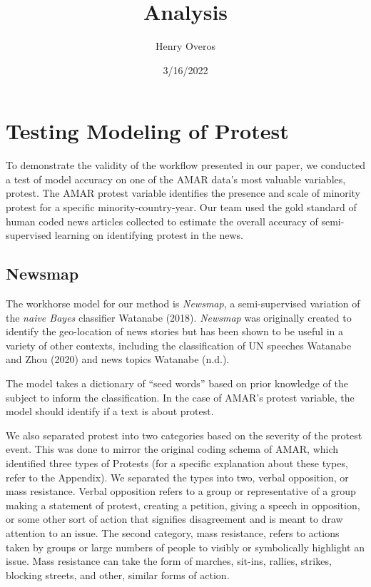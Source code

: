 \documentclass[
]{article}
\title{Analysis}
\author{Henry Overos}
\date{3/16/2022}
\begin{document}
\maketitle

\hypertarget{testing-modeling-of-protest}{%
\section{Testing Modeling of
Protest}\label{testing-modeling-of-protest}}

To demonstrate the validity of the workflow presented in our paper, we
conducted a test of model accuracy on one of the AMAR data's most
valuable variables, protest. The AMAR protest variable identifies the
presence and scale of minority protest for a specific
minority-country-year. Our team used the gold standard of human coded
news articles collected to estimate the overall accuracy of
semi-supervised learning on identifying protest in the news.

\hypertarget{newsmap}{%
\subsection{Newsmap}\label{newsmap}}

The workhorse model for our method is \emph{Newsmap}, a semi-supervised
variation of the \emph{naive Bayes} classifier Watanabe (2018).
\emph{Newsmap} was originally created to identify the geo-location of
news stories but has been shown to be useful in a variety of other
contexts, including the classification of UN speeches Watanabe and Zhou
(2020) and news topics Watanabe (n.d.).

The model takes a dictionary of ``seed words'' based on prior knowledge
of the subject to inform the classification. In the case of AMAR's
protest variable, the model should identify if a text is about protest.

We also separated protest into two categories based on the severity of
the protest event. This was done to mirror the original coding schema of
AMAR, which identified three types of Protests (for a specific
explanation about these types, refer to the Appendix). We separated the
types into two, verbal opposition, or mass resistance. Verbal opposition
refers to a group or representative of a group making a statement of
protest, creating a petition, giving a speech in opposition, or some
other sort of action that signifies disagreement and is meant to draw
attention to an issue. The second category, mass resistance, refers to
actions taken by groups or large numbers of people to visibly or
symbolically highlight an issue. Mass resistance can take the form of
marches, sit-ins, rallies, strikes, blocking streets, and other, similar
forms of action.
\end{document}
